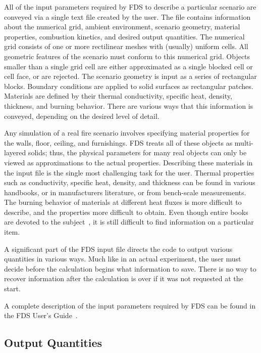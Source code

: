 \documentclass[11pt]{book}
\begin{document}
All of the input parameters required by FDS to describe a particular scenario are conveyed via a single text file created by the user. The file contains information about the numerical grid, ambient environment, scenario geometry, material properties, combustion kinetics, and desired output quantities. The numerical grid consists of one or more rectilinear meshes with (usually) uniform cells. All geometric features of the scenario must conform to this numerical grid. Objects smaller than a single grid cell are either approximated as a single blocked cell or cell face, or are rejected. The scenario geometry is input as a series of rectangular blocks. Boundary conditions are applied to solid surfaces as rectangular patches. Materials are defined by their thermal conductivity, specific heat, density, thickness, and burning behavior. There are various ways that this information is conveyed, depending on the desired level of detail.

Any simulation of a real fire scenario involves specifying material properties for the walls, floor, ceiling, and furnishings. FDS treats all of these objects as multi-layered solids; thus, the physical parameters for many real objects can only be viewed as approximations to the actual properties. Describing these materials in the input file is the single most challenging task for the user. Thermal properties such as conductivity, specific heat, density, and thickness can be found in various handbooks, or in manufacturers literature, or from bench-scale measurements. The burning behavior of materials at different heat fluxes is more difficult to describe, and the properties more difficult to obtain. Even though entire books are devoted to the subject~\cite{Babrauskas:2}, it is still difficult to find information on a particular item.

A significant part of the FDS input file directs the code to output various quantities in various ways. Much like in an actual experiment, the user must decide before the calculation begins what information to save. There is no way to recover information after the calculation is over if it was not requested at the start.

A complete description of the input parameters required by FDS can be found in the FDS User's Guide~\cite{FDS_Users_Guide}.


\subsection{Output Quantities}
\end{document}
